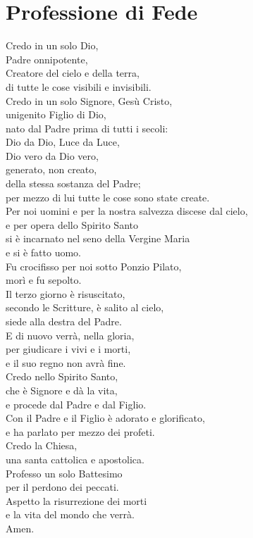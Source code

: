  
\section*{Professione di Fede}

\begin{dialoghi}
	\item[\tutti] Credo in un solo Dio,\\
	Padre onnipotente,\\
	Creatore del cielo e della terra,\\
	di tutte le cose visibili e invisibili.\\
	Credo in un solo Signore, Gesù Cristo,\\
	unigenito Figlio di Dio,\\
	nato dal Padre prima di tutti i secoli:\\
	Dio da Dio, Luce da Luce,\\
	Dio vero da Dio vero,\\
	generato, non creato,\\
	della stessa sostanza del Padre;\\
	per mezzo di lui tutte le cose sono state create.\\
	Per noi uomini e per la nostra salvezza discese dal cielo,\\
	e per opera dello Spirito Santo\\
	si è incarnato nel seno della Vergine Maria\\
	e si è fatto uomo.\\
	Fu crocifisso per noi sotto Ponzio Pilato,\\
	morì e fu sepolto.\\
	Il terzo giorno è risuscitato,\\
	secondo le Scritture, è salito al cielo,\\
	siede alla destra del Padre.\\
	E di nuovo verrà, nella gloria,\\
	per giudicare i vivi e i morti,\\
	e il suo regno non avrà fine.\\
	Credo nello Spirito Santo,\\
	che è Signore e dà la vita,\\
	e procede dal Padre e dal Figlio.\\
	Con il Padre e il Figlio è adorato e glorificato,\\
	e ha parlato per mezzo dei profeti.\\
	Credo la Chiesa,\\
	una santa cattolica e apostolica.\\
	Professo un solo Battesimo\\
	per il perdono dei peccati.\\
	Aspetto la risurrezione dei morti\\
	e la vita del mondo che verrà.\\
	Amen.
\end{dialoghi}

